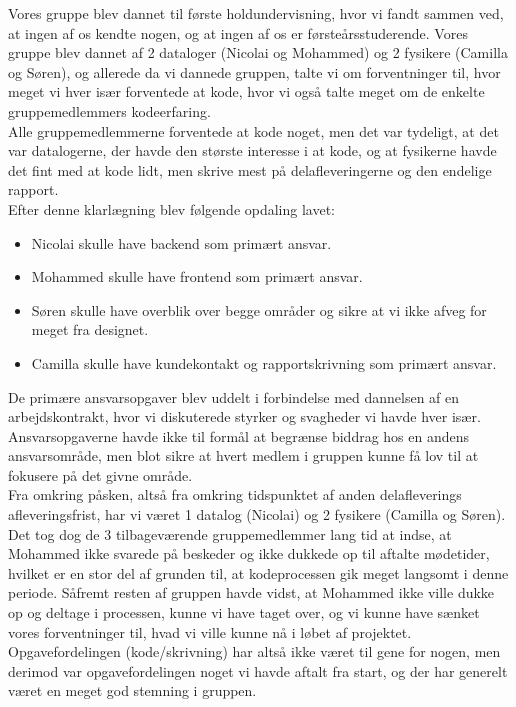 \documentclass[]{article}
\begin{document}
Vores gruppe blev dannet til første holdundervisning, hvor vi fandt sammen ved, at ingen af os kendte nogen, og at ingen af os er førsteårsstuderende. Vores gruppe blev dannet af 2 dataloger (Nicolai og Mohammed) og 2 fysikere (Camilla og Søren), og allerede da vi dannede gruppen, talte vi om forventninger til, hvor meget vi hver især forventede at kode, hvor vi også talte meget om de enkelte gruppemedlemmers kodeerfaring. \\
Alle gruppemedlemmerne forventede at kode noget, men det var tydeligt, at det var datalogerne, der havde den største interesse i at kode, og at fysikerne havde det fint med at kode lidt, men skrive mest på delafleveringerne og den endelige rapport. \\
Efter denne klarlægning blev følgende opdaling lavet:
\begin{itemize}
    \item Nicolai skulle have backend som primært ansvar.
    \item Mohammed skulle have frontend som primært ansvar.
    \item Søren skulle have overblik over begge områder og sikre at vi ikke afveg for meget fra designet. 
    \item Camilla skulle have kundekontakt og rapportskrivning som primært ansvar. 
\end{itemize}
De primære ansvarsopgaver blev uddelt i forbindelse med dannelsen af en arbejdskontrakt, hvor vi diskuterede styrker og svagheder vi havde hver især. Ansvarsopgaverne havde ikke til formål at begrænse biddrag hos en andens ansvarsområde, men blot sikre at hvert medlem i gruppen kunne få lov til at fokusere på det givne område. \\ 
\indent Fra omkring påsken, altså fra omkring tidspunktet af anden delafleverings afleveringsfrist, har vi været 1 datalog (Nicolai) og 2 fysikere (Camilla og Søren). Det tog dog de 3 tilbageværende gruppemedlemmer lang tid at indse, at Mohammed ikke svarede på beskeder og ikke dukkede op til aftalte mødetider, hvilket er en stor del af grunden til, at kodeprocessen gik meget langsomt i denne periode. Såfremt resten af gruppen havde vidst, at Mohammed ikke ville dukke op og deltage i processen, kunne vi have taget over, og vi kunne have sænket vores forventninger til, hvad vi ville kunne nå i løbet af projektet. \\
\indent Opgavefordelingen (kode/skrivning) har altså ikke været til gene for nogen, men derimod var opgavefordelingen noget vi havde aftalt fra start, og der har generelt været en meget god stemning i gruppen.
\end{document}
